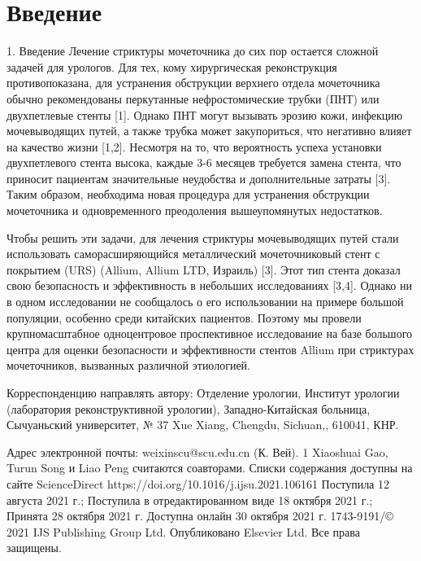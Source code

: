 \chapter*{Введение}

1. Введение
Лечение стриктуры мочеточника до сих пор остается сложной задачей для урологов. Для тех, кому хирургическая реконструкция противопоказана, для устранения обструкции верхнего отдела мочеточника обычно рекомендованы перкутанные нефростомические трубки (ПНТ) или двухпетлевые стенты [1]. Однако ПНТ могут вызывать эрозию кожи, инфекцию мочевыводящих путей, а также трубка может закупориться, что негативно влияет на качество жизни [1,2]. Несмотря на то, что вероятность успеха установки двухпетлевого стента высока, каждые 3-6 месяцев требуется замена стента, что приносит пациентам значительные неудобства и дополнительные затраты [3]. Таким образом, необходима новая процедура для устранения обструкции мочеточника и одновременного преодоления вышеупомянутых недостатков.

Чтобы решить эти задачи, для лечения стриктуры мочевыводящих путей стали использовать саморасширяющийся металлический мочеточниковый стент с покрытием (URS) (Allium, Allium LTD, Израиль) [3]. Этот тип стента доказал свою безопасность и эффективность в небольших исследованиях [3,4]. Однако ни в одном исследовании не сообщалось о его использовании на примере большой популяции, особенно среди китайских пациентов. Поэтому мы провели крупномасштабное одноцентровое проспективное исследование на базе большого центра для оценки безопасности и эффективности стентов Allium при стриктурах мочеточников, вызванных различной этиологией.



Корреспонденцию направлять автору: Отделение урологии, Институт урологии (лаборатория реконструктивной урологии), Западно-Китайская больница, Сычуаньский университет, № 37 Xue Xiang, Chengdu, Sichuan,, 610041, КНР.

Адрес электронной почты: weixinscu@scu.edu.cn (К. Вей). 
1 Xiaoshuai Gao, Turun Song и Liao Peng считаются соавторами.
Списки содержания доступны на сайте ScienceDirect
https://doi.org/10.1016/j.ijsu.2021.106161
Поступила 12 августа 2021 г.; Поступила в отредактированном виде 18 октября 2021 г.; Принята 28 октября 2021 г.
Доступна онлайн 30 октября 2021 г.
1743-9191/© 2021 IJS Publishing Group Ltd. Опубликовано Elsevier Ltd. Все права защищены.
